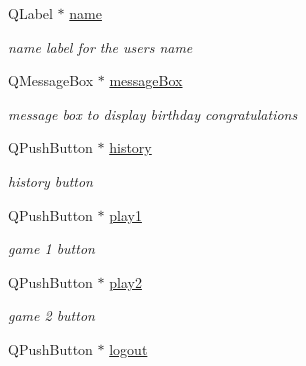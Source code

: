 \begin{DoxyCompactItemize}
\mbox{\label{classsigninwidget_ac1aca24cebcf22cd77c681a3b0c7f171}} 
Q\+Label $\ast$ \hyperlink{classsigninwidget_ac1aca24cebcf22cd77c681a3b0c7f171}{name}
\begin{DoxyCompactList}\small\item\em name label for the user\textquotesingle{}s name \end{DoxyCompactList}\item 
\mbox{\label{classsigninwidget_a812fea770f80db3166d5dc147cf3f69c}} 
Q\+Message\+Box $\ast$ \hyperlink{classsigninwidget_a812fea770f80db3166d5dc147cf3f69c}{message\+Box}
\begin{DoxyCompactList}\small\item\em message box to display birthday congratulations \end{DoxyCompactList}\item 
\mbox{\label{classsigninwidget_a63e301fc2747e03bb83530c416a9ed02}} 
Q\+Push\+Button $\ast$ \hyperlink{classsigninwidget_a63e301fc2747e03bb83530c416a9ed02}{history}
\begin{DoxyCompactList}\small\item\em history button \end{DoxyCompactList}\item 
\mbox{\label{classsigninwidget_a088b44ef57dbd41f053ee997f4f4459f}} 
Q\+Push\+Button $\ast$ \hyperlink{classsigninwidget_a088b44ef57dbd41f053ee997f4f4459f}{play1}
\begin{DoxyCompactList}\small\item\em game 1 button \end{DoxyCompactList}\item 
\mbox{\label{classsigninwidget_a30ca5a2ce91444bee74773b146df45a3}} 
Q\+Push\+Button $\ast$ \hyperlink{classsigninwidget_a30ca5a2ce91444bee74773b146df45a3}{play2}
\begin{DoxyCompactList}\small\item\em game 2 button \end{DoxyCompactList}\item 
\mbox{\label{classsigninwidget_a37c87918de3d570ad763b5b95282dd48}} 
Q\+Push\+Button $\ast$ \hyperlink{classsigninwidget_a37c87918de3d570ad763b5b95282dd48}{logout}

\end{DoxyCompactItemize}

